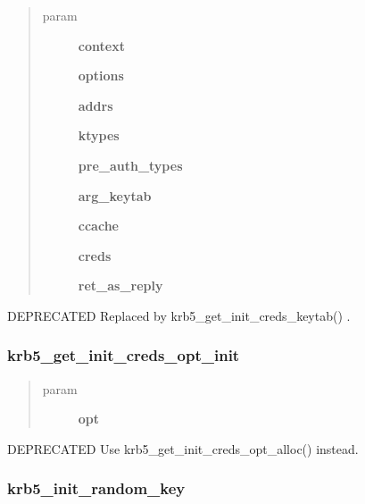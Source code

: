 \documentclass[letterpaper,10pt,english]{sphinxmanual}
\begin{document}
\begin{quote}\begin{description}
\item[{param}] \leavevmode
\textbf{context}

\textbf{options}

\textbf{addrs}

\textbf{ktypes}

\textbf{pre\_auth\_types}

\textbf{arg\_keytab}

\textbf{ccache}

\textbf{creds}

\textbf{ret\_as\_reply}

\end{description}\end{quote}

DEPRECATED Replaced by krb5\_get\_init\_creds\_keytab() .


\subsubsection{krb5\_get\_init\_creds\_opt\_init}
\label{appdev/refs/api/krb5_get_init_creds_opt_init:krb5-get-init-creds-opt-init}\label{appdev/refs/api/krb5_get_init_creds_opt_init::doc}

\begin{fulllineitems}
\label{appdev/refs/api/krb5_get_init_creds_opt_init:c.krb5_get_init_creds_opt_init}
\end{fulllineitems}

\begin{quote}\begin{description}
\item[{param}] \leavevmode
\textbf{opt}

\end{description}\end{quote}

DEPRECATED Use krb5\_get\_init\_creds\_opt\_alloc() instead.


\subsubsection{krb5\_init\_random\_key}
\label{appdev/refs/api/krb5_init_random_key:krb5-init-random-key}\label{appdev/refs/api/krb5_init_random_key::doc}
\end{document}
